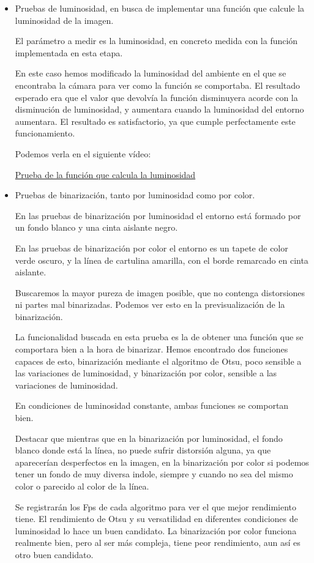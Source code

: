 \begin{itemize}
	\item Pruebas de luminosidad, en busca de implementar una función que calcule la luminosidad de la imagen. 

El parámetro a medir es la luminosidad, en concreto medida con la
función implementada en esta etapa.

En este caso hemos modificado la luminosidad del ambiente en el que se encontraba la cámara para ver como la función se comportaba. El resultado esperado era que el valor que devolvía la función disminuyera acorde con la disminución de luminosidad, y aumentara cuando la luminosidad del entorno aumentara. El resultado es satisfactorio, ya que cumple perfectamente este funcionamiento.
	
	Podemos verla en el siguiente vídeo:
	
	\href{https://youtu.be/CuTADdioU4g}{Prueba de la función que calcula la luminosidad}	
	
	\item Pruebas de binarización, tanto por luminosidad como por color. 
	
	En las pruebas de binarización por luminosidad el entorno está formado por un fondo blanco y una cinta aislante negro.
	
En las pruebas de binarización por color el entorno es un tapete de color verde oscuro, y la línea de cartulina amarilla, con el borde remarcado en cinta aislante.

Buscaremos la mayor pureza de imagen posible, que no contenga
distorsiones ni partes mal binarizadas. Podemos ver esto en la previsualización de la binarización.

La funcionalidad buscada en esta prueba es la de obtener una función que se comportara bien a la hora de binarizar. Hemos encontrado dos funciones capaces de esto, binarización mediante el algoritmo de Otsu, poco sensible a las variaciones de luminosidad, y binarización por color, sensible a las variaciones de luminosidad.

En condiciones de luminosidad constante, ambas funciones se comportan bien.

Destacar que mientras que en la binarización por luminosidad, el fondo blanco donde está la línea, no puede sufrir distorsión alguna, ya que aparecerían desperfectos en la imagen, en la binarización por color si podemos tener un fondo de muy diversa indole, siempre y cuando no sea del mismo color o parecido al color de la línea.

	Se registrarán los Fps de cada algoritmo para ver el que mejor rendimiento tiene. El rendimiento de Otsu y su versatilidad en diferentes condiciones de luminosidad lo hace un buen candidato. La binarización por color funciona realmente bien, pero al ser más compleja, tiene peor rendimiento, aun así es otro buen candidato.
	

\end{itemize}
